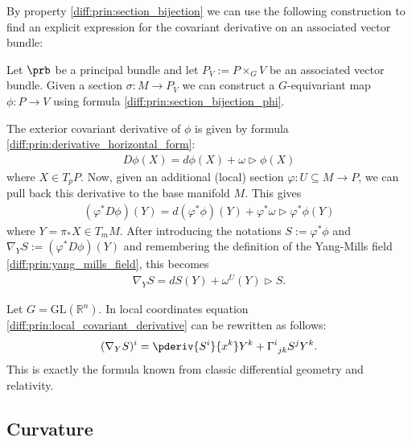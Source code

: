     By property \ref{diff:prin:section_bijection} we can use the following construction to find an explicit expression for the covariant derivative on an associated vector bundle:
    \begin{construct}
        Let $\prb$ be a principal bundle and let $P_V := P\times_G V$ be an associated vector bundle. Given a section $\sigma:M\rightarrow P_V$ we can construct a $G$-equivariant map $\phi:P\rightarrow V$ using formula \ref{diff:prin:section_bijection_phi}.

        The exterior covariant derivative of $\phi$ is given by formula \ref{diff:prin:derivative_horizontal_form}:
        \begin{gather}
            D\phi(X) = d\phi(X) + \omega\triangleright\phi(X)
        \end{gather}
        where $X\in T_pP$. Now, given an additional (local) section $\varphi:U\subseteq M\rightarrow P$, we can pull back this derivative to the base manifold $M$. This gives
        \begin{gather}
            (\varphi^*D\phi)(Y) = d(\varphi^*\phi)(Y) + \varphi^*\omega\triangleright\varphi^*\phi(Y)
        \end{gather}
        where $Y=\pi_*X\in T_mM$. After introducing the notations $S:=\varphi^*\phi$ and $\nabla_YS:=(\varphi^*D\phi)(Y)$ and remembering the definition of the Yang-Mills field \ref{diff:prin:yang_mills_field}, this becomes
        \begin{gather}
            \label{diff:prin:local_covariant_derivative}
            \nabla_YS = dS(Y) + \omega^U(Y)\triangleright S.
        \end{gather}
    \end{construct}
    \begin{example}
        Let $G=\text{GL}(\mathbb{R}^n)$. In local coordinates equation \ref{diff:prin:local_covariant_derivative} can be rewritten as follows:
        \begin{gather}
            (\nabla_YS)^i = \pderiv{S^i}{x^k}Y^k + \Gamma^i_{\ jk}S^jY^k.
        \end{gather}
        This is exactly the formula known from classic differential geometry and relativity.
    \end{example}

\subsection{Curvature}

